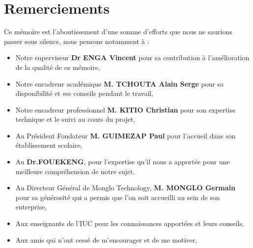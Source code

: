 \chapter*{Remerciements}         %

Ce mémoire est l'aboutissement d'une somme d'efforts que nous ne saurions passer sous silence, nous pensons notamment à :

\begin{itemize}
    \item Notre superviseur \textbf{Dr ENGA Vincent} pour sa contribution à l'amélioration de la qualité de ce mémoire,
    \item Notre encadreur académique  \textbf{M. TCHOUTA Alain Serge} pour sa disponibilité et ses conseils pendant le travail,
    \item  Notre encadreur professionnel \textbf{M. KITIO Christian} pour son expertise technique et le suivi au cours du projet,
    \item Au Président Fondateur \textbf{M. GUIMEZAP Paul} pour l’accueil dans son établissement scolaire,
    
    \item Au \textbf{Dr.FOUEKENG}, pour l'expertise qu'il nous a apportée pour une meilleure compréhension de notre sujet.
    \item Au Directeur Général de Monglo Technology, \textbf{M. MONGLO Germain} pour sa générosité qui a permis que l'on soit accueilli au sein de son entreprise,
    \item Aux enseignants de l’IUC pour les connaissances apportées et leurs conseils,
    \item Aux amis qui n’ont cessé de m’encourager et de me motiver,
\end{itemize}